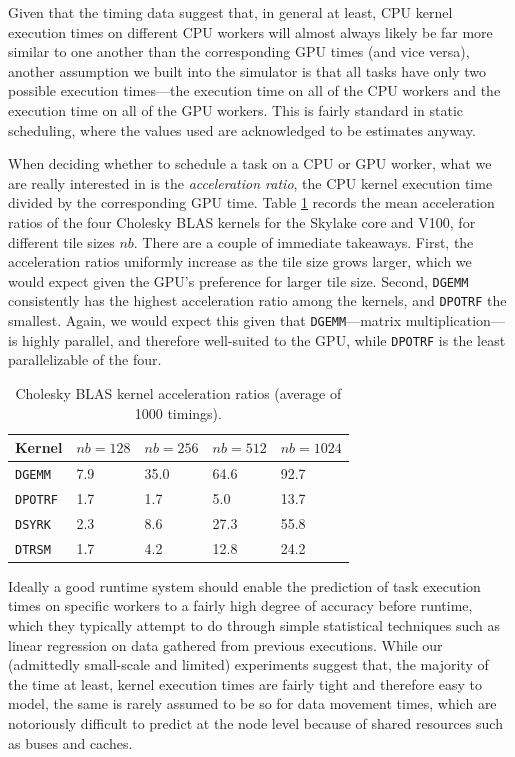 \documentclass[runningheads]{llncs}
\begin{document}
Given that the timing data suggest that, in general at least, CPU kernel execution times on different CPU workers will almost always likely be far more similar to one another than the corresponding GPU times (and vice versa), another assumption we built into the simulator is that all tasks have only two possible execution times---the execution time on all of the CPU workers and the execution time on all of the GPU workers. This is fairly standard in static scheduling, where the values used are acknowledged to be estimates anyway.  

When deciding whether to schedule a task on a CPU or GPU worker, what we are really interested in is the {\em acceleration ratio}, the CPU kernel execution time divided by the corresponding GPU time. Table \ref{tb.blas_routine_acc_ratios} records the mean acceleration ratios of the four Cholesky BLAS kernels for the Skylake core and V100, for different tile sizes $nb$. There are a couple of immediate takeaways. First, the acceleration ratios uniformly increase as the tile size grows larger, which we would expect given the GPU's preference for larger tile size. Second, {\tt DGEMM} consistently has the highest acceleration ratio among the kernels, and {\tt DPOTRF} the smallest. Again, we would expect this given that {\tt DGEMM}---matrix multiplication---is highly parallel, and therefore well-suited to the GPU, while {\tt DPOTRF} is the least parallelizable of the four. 
\begin{table}
	\begin{center}
	\caption{Cholesky BLAS kernel acceleration ratios (average of 1000 timings).}\label{tb.blas_routine_acc_ratios}
	\begin{tabular}{|l|l|l|l|l|}
		\hline
		{\bf Kernel}  & $nb = 128$ & $nb = 256$ & $nb = 512$ & $nb = 1024$\\
		\hline
		{\tt DGEMM} & 7.9 & 35.0 & 64.6 & 92.7 \\
		{\tt DPOTRF} & 1.7 & 1.7 & 5.0 & 13.7\\
		{\tt DSYRK} & 2.3 & 8.6 & 27.3 & 55.8\\
		{\tt DTRSM} & 1.7 & 4.2 & 12.8 & 24.2 \\
		\hline
	\end{tabular}
\end{center}
\end{table}

Ideally a good runtime system should enable the prediction of task execution times on specific workers to a fairly high degree of accuracy before runtime, which they typically attempt to do through simple statistical techniques such as linear regression on data gathered from previous executions. While our (admittedly small-scale and limited) experiments suggest that, the majority of the time at least, kernel execution times are fairly tight and therefore easy to model, the same is rarely assumed to be so for data movement times, which are notoriously difficult to predict at the node level because of shared resources such as buses and caches. 
\end{document}
